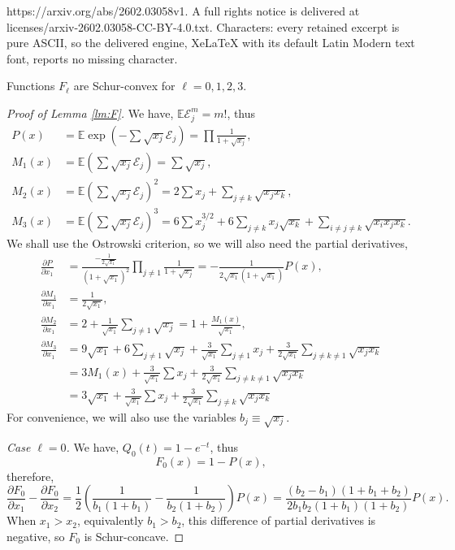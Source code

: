 \documentclass[10pt,a4paper]{amsart}
\newcommand{\E}{\mathbb{E}}
\newcommand{\cE}{\mathscr{E}}
\begin{document}
https://arxiv.org/abs/2602.03058v1. A full rights notice is delivered at licenses/arxiv-2602.03058-CC-BY-4.0.txt. Characters: every retained excerpt is pure ASCII, so the delivered engine, XeLaTeX with its default Latin Modern text font, reports no missing character.
\begin{lemma}\label{lm:F}
Functions $F_\ell$ are Schur-convex for $\ell = 0, 1, 2, 3$.
\end{lemma}

\begin{proof}[Proof of Lemma \ref{lm:F}]
We have, $\E \cE_j^m = m!$, thus
\begin{align*}
P(x) &= \E \exp\left(-\sum \sqrt{x_j}\cE_j\right) = \prod \frac{1}{1+\sqrt{x_j}}, \\
M_1(x) &= \E \left(\sum \sqrt{x_j}\cE_j\right) = \sum \sqrt{x_j}, \\
M_2(x) &= \E \left(\sum \sqrt{x_j}\cE_j\right)^2 = 2\sum x_j + \sum_{j \neq k} \sqrt{x_jx_k}, \\
M_3(x) &= \E \left(\sum \sqrt{x_j}\cE_j\right)^3 = 6\sum x_j^{3/2} + 6\sum_{j \neq k} x_j\sqrt{x_k} + \sum_{i \neq j \neq k} \sqrt{x_ix_jx_k}.
\end{align*}
We shall use the Ostrowski criterion, so we will also need the partial derivatives,
\begin{align*}
\frac{\partial P}{\partial x_1} &= \frac{-\frac{1}{2\sqrt{x_1}}}{(1+\sqrt{x_1})^2}\prod_{j\neq 1} \frac{1}{1+\sqrt{x_j}} = -\frac{1}{2\sqrt{x_1}(1+\sqrt{x_1})}P(x),\\
\frac{\partial M_1}{\partial x_1} &= \frac{1}{2\sqrt{x_1}},\\
\frac{\partial M_2}{\partial x_1} &= 2 + \frac{1}{\sqrt{x_1}}\sum_{j\neq 1}\sqrt{x_j} = 1+\frac{M_1(x)}{\sqrt{x_1}},\\
\frac{\partial M_3}{\partial x_1} &= 9\sqrt{x_1} + 6\sum_{j\neq 1}\sqrt{x_j} + \frac{3}{\sqrt{x_1}}\sum_{j\neq 1}x_j + \frac{3}{2\sqrt{x_1}}\sum_{j\neq k \neq 1} \sqrt{x_jx_k} \\
&= 3M_1(x) + \frac{3}{\sqrt{x_1}}\sum x_j + \frac{3}{2\sqrt{x_1}}\sum_{j\neq k \neq 1} \sqrt{x_jx_k}\\
&=3\sqrt{x_1}+\frac{3}{\sqrt{x_1}}\sum x_j + \frac{3}{2\sqrt{x_1}}\sum_{j\neq k} \sqrt{x_jx_k}
\end{align*}
For convenience, we will also use the variables $b_j \equiv \sqrt{x_j}$.

\emph{Case $\ell = 0$.} We have, $Q_0(t) = 1 - e^{-t}$, thus
\[
F_0(x) = 1 - P(x),
\]
therefore,
\[
\frac{\partial F_0}{\partial x_1} - \frac{\partial F_0}{\partial x_2} = \frac12\left(\frac{1}{b_1(1+b_1)} - \frac{1}{b_2(1+b_2)}\right)P(x) = \frac{(b_2-b_1)(1+b_1+b_2)}{2b_1b_2(1+b_1)(1+b_2)}P(x).
\]
When $x_1 > x_2$, equivalently $b_1 > b_2$, this difference of partial derivatives is negative, so $F_0$ is Schur-concave.


\end{proof}
\end{document}
